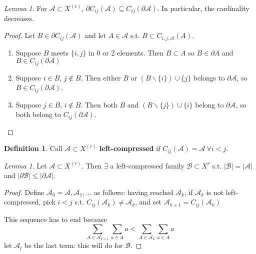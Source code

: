 \documentclass[a4paper]{article}
\theoremstyle{definition}
\newtheorem*{definition}{Definition}
\theoremstyle{remark}
\theoremstyle{default}
\newtheorem{lemma}[theorem]{Lemma}
\newcommand*\abs[1]{\left|#1\right|}
\begin{document}
\begin{lemma}
	For $\mathcal{A} \subset X^{(r)}$, $\partial C_{ij}(\mathcal{A}) \subseteq C_{ij}(\partial \mathcal{A})$. In particular, the cardinality decreases.
\end{lemma}
\begin{proof}
	Let $B \in \partial C_{ij}(\mathcal{A})$ and let $A \in \mathcal{A}$ s.t. $B \subset C_{i,j,\mathcal{A}}(A)$.
	\begin{enumerate}[label=\roman*.]
		\item Suppose $B$ meets $\{i,j\}$ in 0 or 2 elements.
		Then $B \subset A$ so $B \in \partial A$ and $B \in C_{ij}(\partial \mathcal{A})$
		
		\item Suppose $i \in B$, $j \not\in B$.
		Then either $B$ or $(B \backslash \{i\}) \cup \{j\}$ belongs to $\partial \mathcal{A}$,
		so $B \in C_{ij}(\partial \mathcal{A})$.
		
		\item Suppose $j \in B$, $i \not\in B$.
		Then both $B$ and $(B \backslash \{j\}) \cup \{i\}$ belong to $\partial\mathcal{A}$,
		so both belong to $C_{ij}(\partial\mathcal{A})$.
	\end{enumerate}
\end{proof}
\begin{definition}
	Call $\mathcal{A} \subset X^{(r)}$ \textbf{left-compressed} if $C_{ij}(\mathcal{A}) = \mathcal{A}\ \forall i < j$.
\end{definition}

\begin{lemma}
	Let $\mathcal{A} \subset X^{(r)}$. Then $\exists$ a left-compressed family $\mathcal{B} \subset X^{r}$ s.t. $\abs{\mathcal{B}}=\abs{\mathcal{A}}$ and $\abs{\partial\mathcal{B}} \leq \abs{\partial\mathcal{A}}$.
\end{lemma}
\begin{proof}
	Define $\mathcal{A}_0 = \mathcal{A}, \mathcal{A}_1, \dots$ as follows:
	having reached $\mathcal{A}_k$,
	if $\mathcal{A}_k$ is not left-compressed,
	pick $i < j$ s.t. $C_{ij}(\mathcal{A}_k) \neq \mathcal{A}_k$,
	and set $\mathcal{A}_{k+1} = C_{ij}(\mathcal{A}_k)$
	
	This sequence has to end because $$\sum_{A \in \mathcal{A}_{k+1}} \sum_{a \in A} a < \sum_{A \in \mathcal{A}_{k}} \sum_{a \in A} a$$
	let $\mathcal{A}_l$ be the last term: this will do for $\mathcal{B}$.
\end{proof}
\end{document}
